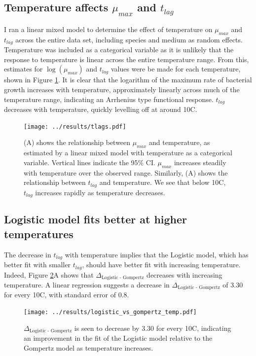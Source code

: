 \documentclass[11pt, a4paper]{article}
\begin{document}
\begin{linenumbers}
        \subsection{Temperature affects $\mu_{max}$ and $t_{lag}$}
        
         I ran a linear mixed model to determine the effect of temperature on $\mu_{max}$ and $t_{lag}$ across the entire data set, including species and medium as random effects. Temperature was included as a categorical variable as it is unlikely that the response to temperature is linear across the entire temperature range. From this, estimates for $\log(\mu_{max})$ and $t_{lag}$ values were be made for each temperature, shown in Figure \ref{fig:params_temp}. It is clear that the logarithm of the maximum rate of bacterial growth increases with temperature, approximately linearly across much of the temperature range, indicating an Arrhenius type functional response. $t_{lag}$ decreases with temperature, quickly levelling off at around 10\degree C. 

                \begin{figure}[H]
        \texttt{[image: ../results/tlags.pdf]}
        \caption{(A) shows the relationship between $\mu_{max}$ and temperature, as estimated by a linear mixed model with temperature as a categorical variable. Vertical lines indicate the 95\% CI. $\mu_{max}$ increases steadily with temperature over the observed range. Similarly, (A) shows the relationship between $t_{lag}$ and temperature. We see that below 10\degree C, $t_{lag}$ increases rapidly as temperature decreases.   }
        \label{fig:params_temp}
        \end{figure}  



\subsection{Logistic model fits better at higher temperatures}

The decrease in $t_{lag}$ with temperature implies that the Logistic model, which has better fit with smaller $t_{lag}$, should have better fit with increasing temperature. Indeed, Figure \ref{fig:logistic_temp}A shows that $\Delta_{\text{Logistic - Gompertz}}$  decreases with increasing temperature. A linear regression suggests a decrease in $\Delta_{\text{Logistic - Gompertz}}$ of 3.30 for every 10\degree C, with standard error of 0.8.

                \begin{figure}[H]
                \centering
        \texttt{[image: ../results/logistic\_vs\_gompertz\_temp.pdf]}
        \caption{$\Delta_{\text{Logistic - Gompertz}}$ is seen to decrease by 3.30 for every 10\degree C, indicating an improvement in the fit of the Logistic model relative to the Gompertz model as temperature increases.}
        \label{fig:logistic_temp}
        \end{figure}  


\end{linenumbers}
\end{document}
